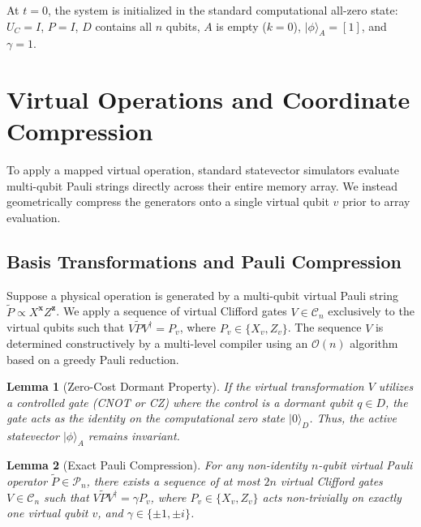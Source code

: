 \documentclass[11pt]{article}
\newtheorem{lemma}{Lemma}
\begin{document}
At $t=0$, the system is initialized in the standard computational all-zero state: $U_C = I$, $P = I$, $D$ contains all $n$ qubits, $A$ is empty ($k=0$), $|\phi\rangle_A = [1]$, and $\gamma = 1$.

\section{Virtual Operations and Coordinate Compression}
\label{sec:virtual_ops}

To apply a mapped virtual operation, standard statevector simulators evaluate multi-qubit Pauli strings directly across their entire memory array. We instead geometrically compress the generators onto a single virtual qubit $v$ prior to array evaluation.

\subsection{Basis Transformations and Pauli Compression}
Suppose a physical operation is generated by a multi-qubit virtual Pauli string $\tilde{P} \propto X^{\mathbf{x}} Z^{\mathbf{z}}$. We apply a sequence of virtual Clifford gates $V \in \mathcal{C}_n$ exclusively to the virtual qubits such that $V \tilde{P} V^\dagger = P_v$, where $P_v \in \{X_v, Z_v\}$. The sequence $V$ is determined constructively by a multi-level compiler using an $\mathcal{O}(n)$ algorithm based on a greedy Pauli reduction.

\begin{lemma}[Zero-Cost Dormant Property]
If the virtual transformation $V$ utilizes a controlled gate (CNOT or CZ) where the control is a dormant qubit $q \in D$, the gate acts as the identity on the computational zero state $|0\rangle_D$. Thus, the active statevector $|\phi\rangle_A$ remains invariant.
\end{lemma}

\begin{lemma}[Exact Pauli Compression]
\label{lem:pauli_compression}
For any non-identity $n$-qubit virtual Pauli operator $\tilde{P} \in \mathcal{P}_n$, there exists a sequence of at most $2n$ virtual Clifford gates $V \in \mathcal{C}_n$ such that $V \tilde{P} V^\dagger = \gamma P_v$, where $P_v \in \{X_v, Z_v\}$ acts non-trivially on exactly one virtual qubit $v$, and $\gamma \in \{\pm 1, \pm i\}$.
\end{lemma}
\end{document}
